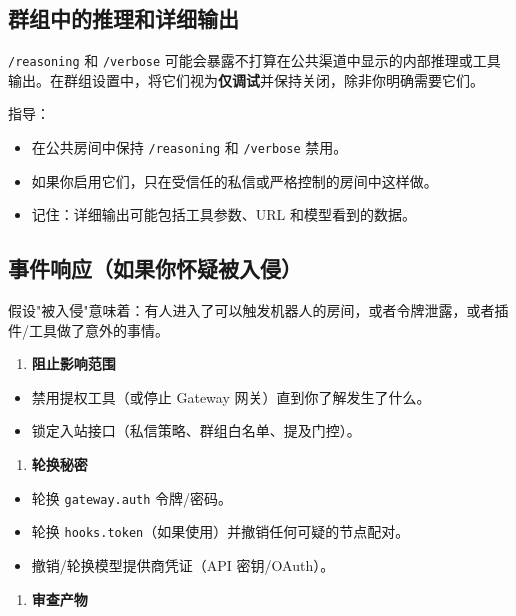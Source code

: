 \subsection{群组中的推理和详细输出}


\texttt{/reasoning} 和 \texttt{/verbose} 可能会暴露不打算在公共渠道中显示的内部推理或工具输出。在群组设置中，将它们视为\textbf{仅调试}并保持关闭，除非你明确需要它们。

指导：

\begin{itemize}
  \item 在公共房间中保持 \texttt{/reasoning} 和 \texttt{/verbose} 禁用。
  \item 如果你启用它们，只在受信任的私信或严格控制的房间中这样做。
  \item 记住：详细输出可能包括工具参数、URL 和模型看到的数据。
\end{itemize}


\subsection{事件响应（如果你怀疑被入侵）}


假设"被入侵"意味着：有人进入了可以触发机器人的房间，或者令牌泄露，或者插件/工具做了意外的事情。

\begin{enumerate}
  \item \textbf{阻止影响范围}
\end{enumerate}

\begin{itemize}
  \item 禁用提权工具（或停止 Gateway 网关）直到你了解发生了什么。
  \item 锁定入站接口（私信策略、群组白名单、提及门控）。
\end{itemize}

\begin{enumerate}
  \item \textbf{轮换秘密}
\end{enumerate}

\begin{itemize}
  \item 轮换 \texttt{gateway.auth} 令牌/密码。
  \item 轮换 \texttt{hooks.token}（如果使用）并撤销任何可疑的节点配对。
  \item 撤销/轮换模型提供商凭证（API 密钥/OAuth）。
\end{itemize}

\begin{enumerate}
  \item \textbf{审查产物}
\end{enumerate}

